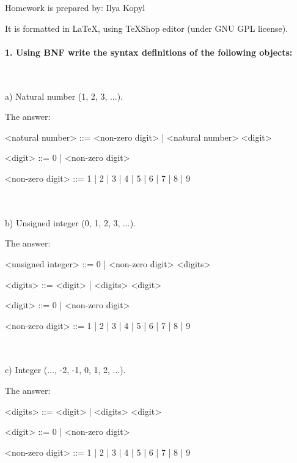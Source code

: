 \documentclass{article}
\begin{document}
Homework is prepared by: Ilya Kopyl

It is formatted in LaTeX, using TeXShop editor (under GNU GPL license).


	\setlength{\grammarparsep}{5pt plus 1pt minus 1pt} %
	\setlength{\grammarindent}{12em} %


	\paragraph{1. Using BNF write the syntax definitions of the following objects:}
	\rmfamily\
	\newline

			a) Natural number (1, 2, 3, ...).
			
			The answer:
	\ttfamily
	\begin{grammar}
	
		<natural number> ::= <non-zero digit> | <natural number> <digit>

		<digit> ::= 0 | <non-zero digit>

		<non-zero digit> ::= 1 | 2 | 3 | 4 | 5 | 6 | 7 | 8 | 9
		
	\end{grammar}


	\paragraph{}
	\rmfamily\
	
			b) Unsigned integer (0, 1, 2, 3, ...).
			
			The answer:
	\ttfamily
		\begin{grammar}
		
		<unsigned integer> ::= 0 | <non-zero digit> <digits>
		
		<digits> ::= <digit> | <digits> <digit>

		<digit> ::= 0 | <non-zero digit>

		<non-zero digit> ::= 1 | 2 | 3 | 4 | 5 | 6 | 7 | 8 | 9
		
	\end{grammar}


	\paragraph{}
	\rmfamily\
	
			c) Integer (..., -2, -1, 0, 1, 2, ...).
			
			The answer:
	\ttfamily
		\begin{grammar}
		
		
				
		<digits> ::= <digit> | <digits> <digit>

		<digit> ::= 0 | <non-zero digit>

		<non-zero digit> ::= 1 | 2 | 3 | 4 | 5 | 6 | 7 | 8 | 9
		
	\end{grammar}
\end{document}
